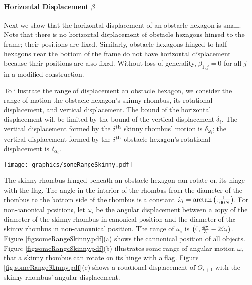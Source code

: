 \paragraph{Horizontal Displacement $\beta$}

Next we show that the horizontal displacement of an obstacle hexagon is small.  
Note that there is no horizontal displacement of obstacle hexagons hinged to the frame; their positions are fixed.  
Similarly, obstacle hexagons hinged to half hexagons near the bottom of the frame do not have horizontal displacement because their positions are also fixed.  
Without loss of generality, $\beta_{1,j}=0$ for all $j$ in a modified construction.

To illustrate the range of displacement an obstacle hexagon, we consider the range of motion the obstacle hexagon's skinny rhombus, its rotational displacement, and vertical displacement.  
The bound of the horizontal displacement will be limited by the bound of the vertical displacement $\delta_i$.  
The vertical displacement formed by the $i^\text{th}$ skinny rhombus' motion is $\delta_{\omega_i}$; the vertical displacement formed by the $i^\text{th}$ obstacle hexagon's rotational displacement is $\delta_{\alpha_i}$.

\begin{minipage}{\linewidth}
\begin{center}
\texttt{[image: graphics/someRangeSkinny.pdf]}
\label{fig:someRangeSkinny.pdf}
\end{center}
\end{minipage}

The skinny rhombus hinged beneath an obstacle hexagon can rotate on its hinge with the flag. 
The angle in the interior of the rhombus from the diameter of the rhombus to the bottom side of the rhombus is a constant $\hat{\omega}_i = \arctan \left( \frac{1}{100N} \right)$.  
For non-canonical positions, let $\omega_i$ be the angular displacement between a copy of the diameter of the skinny rhombus in canonical position and the diameter of the skinny rhombus in non-canonnical position.
The range of $\omega_i$ is $\left( 0, \frac{4 \pi}{3} - 2 \hat{\omega}_i \right)$.
Figure \ref{fig:someRangeSkinny.pdf}(a) shows the cannonical position of all objects.  
Figure \ref{fig:someRangeSkinny.pdf}(b) illustrates some range of angular motion $\omega_i$ that a skinny rhombus can rotate on its hinge with a flag.  
Figure \ref{fig:someRangeSkinny.pdf}(c) shows a rotational displacement of $O_{i+1}$ with the skinny rhombus' angular displacement.


